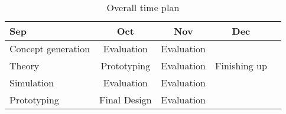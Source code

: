 \begin{table}
    \caption{Overall time plan}
    \begin{tabular}{| l | c | c | c | c }
        \hline
        Sep & Oct & Nov & Dec \\
        \hline \hline
        Concept generation & Evaluation & Evaluation &  \\ 
        \hline
        Theory & Prototyping & Evaluation & Finishing up \\
        \hline
        Simulation & Evaluation & Evaluation & \\
        \hline
        Prototyping & Final Design & Evaluation &  \\
        \hline

    \end{tabular}
    \label{tab:overall_time_plan}
\end{table} 


